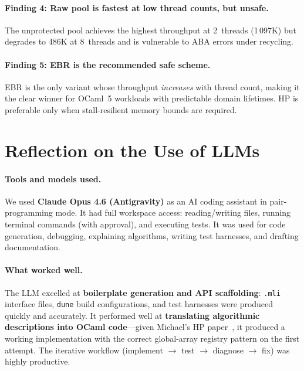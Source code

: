 \documentclass[11pt,a4paper]{article}
\begin{document}
\paragraph{Finding 4: Raw pool is fastest at low thread counts, but unsafe.}
The unprotected pool achieves the highest throughput at 2~threads (1\,097K)
but degrades to 486K at 8~threads and is vulnerable to ABA errors under
recycling.

\paragraph{Finding 5: EBR is the recommended safe scheme.}
EBR is the only variant whose throughput \emph{increases} with thread count,
making it the clear winner for OCaml~5 workloads with predictable domain
lifetimes.  HP is preferable only when stall-resilient memory bounds are
required.

\section{Reflection on the Use of LLMs}
\label{sec:llm}

\paragraph{Tools and models used.}
We used \textbf{Claude Opus 4.6 (Antigravity)} as an AI coding assistant in
pair-programming mode.  It had full workspace access: reading/writing files,
running terminal commands (with approval), and executing tests.  It was used
for code generation, debugging, explaining algorithms, writing test harnesses,
and drafting documentation.

\paragraph{What worked well.}
The LLM excelled at \textbf{boilerplate generation and API scaffolding}:
\texttt{.mli} interface files, \texttt{dune} build configurations, and test
harnesses were produced quickly and accurately.  It performed well at
\textbf{translating algorithmic descriptions into OCaml code}---given
Michael's HP paper~\cite{michael2004hazard}, it produced a working
implementation with the correct global-array registry pattern on the first
attempt.  The iterative workflow (implement $\to$ test $\to$ diagnose $\to$
fix) was highly productive.
\end{document}
